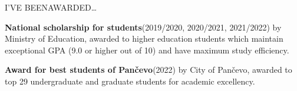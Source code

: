 \begin{minipage}[t]{\linewidth}
{\alignRight\titleFont\light I'VE BEEN\linebreak\alignRight AWARDED\ldots}\newline

\vspace{-3mm}
{\contentFont\textbf{National scholarship for students}\linebreak (2019/2020, 2020/2021, 2021/2022)  by Ministry of Education, awarded to higher education students which maintain exceptional GPA (9.0 or higher out of 10) and have maximum study efficiency.}\alignRight\linebreak
\end{minipage}\newline

\begin{minipage}[t]{\linewidth}\vspace{1mm}\vspace{\rContentTopMargin}
{\contentFont\textbf{Award for best students of Pančevo}\linebreak (2022) by City of Pančevo, awarded to top 29 undergraduate and graduate students for academic excellency.}\alignRight\linebreak
\end{minipage}\newline